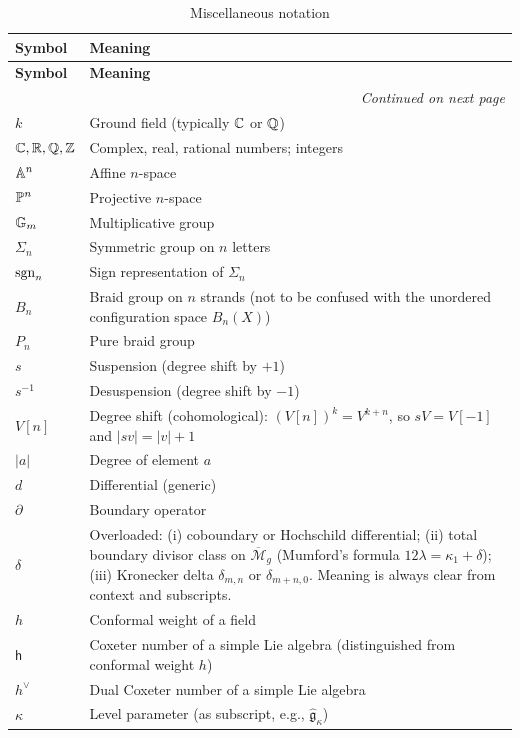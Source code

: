 \begin{longtable}{p{3cm} p{10cm}}
\caption{Miscellaneous notation} \\
\toprule
\textbf{Symbol} & \textbf{Meaning} \\
\midrule
\endfirsthead
\toprule
\textbf{Symbol} & \textbf{Meaning} \\
\midrule
\endhead
\midrule
\multicolumn{2}{r}{\textit{Continued on next page}} \\
\endfoot
\bottomrule
\endlastfoot

$k$ & Ground field (typically $\mathbb{C}$ or $\mathbb{Q}$) \\
$\mathbb{C}, \mathbb{R}, \mathbb{Q}, \mathbb{Z}$ & Complex, real, rational numbers; integers \\
$\mathbb{A}^n$ & Affine $n$-space \\
$\mathbb{P}^n$ & Projective $n$-space \\
$\mathbb{G}_m$ & Multiplicative group \\
$\Sigma_n$ & Symmetric group on $n$ letters \\
$\operatorname{sgn}_n$ & Sign representation of $\Sigma_n$ \\
$B_n$ & Braid group on $n$ strands (not to be confused with the unordered configuration space $B_n(X)$) \\
$P_n$ & Pure braid group \\
$s$ & Suspension (degree shift by $+1$) \\
$s^{-1}$ & Desuspension (degree shift by $-1$) \\
$V[n]$ & Degree shift (cohomological): $(V[n])^k = V^{k+n}$, so $sV = V[-1]$ and $|sv| = |v| + 1$ \\
$|a|$ & Degree of element $a$ \\
$d$ & Differential (generic) \\
$\partial$ & Boundary operator \\
$\delta$ & Overloaded: (i) coboundary or Hochschild differential; (ii) total boundary divisor class on $\overline{\mathcal{M}}_g$ (Mumford's formula $12\lambda = \kappa_1 + \delta$); (iii) Kronecker delta $\delta_{m,n}$ or $\delta_{m+n,0}$.  Meaning is always clear from context and subscripts. \\
$h$ & Conformal weight of a field \\
$\mathsf{h}$ & Coxeter number of a simple Lie algebra (distinguished from conformal weight $h$) \\
$h^\vee$ & Dual Coxeter number of a simple Lie algebra \\
$\kappa$ & Level parameter (as subscript, e.g., $\hat{\mathfrak{g}}_\kappa$) \\

\end{longtable}

